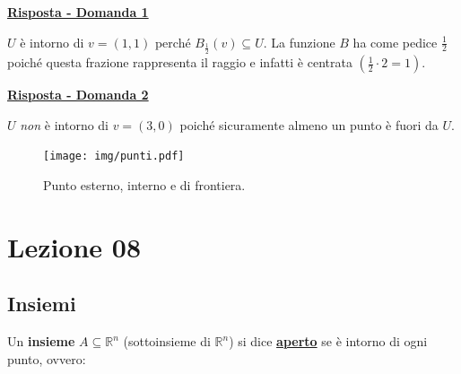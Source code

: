\documentclass[a4paper]{article}
\begin{document}
	\noindent
	\textcolor{Green4}{\textbf{\underline{Risposta - Domanda 1}}}\newline
	
	\noindent
	$U$ è intorno di $v = \left(1,1\right)$ perché $B_{\frac{1}{2}}\left(v\right) \subseteq U$. La funzione $B$ ha come pedice $\frac{1}{2}$ poiché questa frazione rappresenta il raggio e infatti è centrata $\left(\frac{1}{2} \cdot 2 = 1\right)$.\newline
	
	\noindent
	\textcolor{Green4}{\textbf{\underline{Risposta - Domanda 2}}}\newline
	
	\noindent
	$U$ \emph{non} è intorno di $v = \left(3,0\right)$ poiché sicuramente almeno un punto è fuori da $U$.
	
	\newpage
	
	\noindent{}

	\begin{figure}[!htp]
		\centering
		\texttt{[image: img/punti.pdf]}
		\caption{Punto esterno, interno e di frontiera.}
	\end{figure}

	\newpage
	
	\section{Lezione 08}
	
	\subsection{Insiemi}
	
	Un \textbf{insieme} $A \subseteq \mathbb{R}^{n}$ (sottoinsieme di $\mathbb{R}^{n}$) si dice \textcolor{Red3}{\textbf{\underline{aperto}}} se è intorno di ogni punto, ovvero:
	
\end{document}
